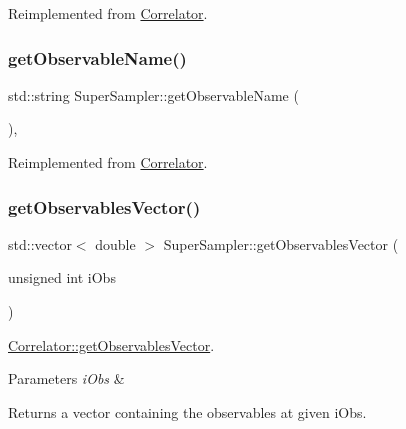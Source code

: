 Reimplemented from \mbox{\hyperlink{class_correlator_ac780d8b180294ee4801ede6e6a13f7f4}{Correlator}}.

\mbox{\label{class_super_sampler_a84d3ba9a56dd2a36cb11d495c32f5ca6}} 
\subsubsection{\texorpdfstring{getObservableName()}{getObservableName()}}
{\footnotesize\ttfamily std\+::string Super\+Sampler\+::get\+Observable\+Name (\begin{DoxyParamCaption}{ }\end{DoxyParamCaption})\hspace{0.3cm}{\ttfamily [inline]}, {\ttfamily [virtual]}}



Reimplemented from \mbox{\hyperlink{class_correlator_ad1fa59e864917c3e48da037f90c3488f}{Correlator}}.

\mbox{\label{class_super_sampler_a2b81588289576169c2148a88ddad482f}} 
\subsubsection{\texorpdfstring{getObservablesVector()}{getObservablesVector()}}
{\footnotesize\ttfamily std\+::vector$<$ double $>$ Super\+Sampler\+::get\+Observables\+Vector (\begin{DoxyParamCaption}\item[{unsigned int}]{i\+Obs }\end{DoxyParamCaption})\hspace{0.3cm}{\ttfamily [virtual]}}



\mbox{\hyperlink{class_correlator_a7fb062b098beb078f3e546f4717b4941}{Correlator\+::get\+Observables\+Vector}}. 


\begin{DoxyParams}{Parameters}
{\em i\+Obs} & \\
\hline
\end{DoxyParams}
\begin{DoxyReturn}{Returns}
a vector containing the observables at given i\+Obs. 
\end{DoxyReturn}


